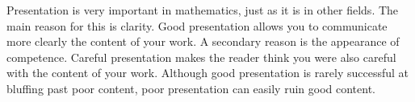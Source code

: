 
%
%
%
%
%
%
%



Presentation is very important in mathematics, just as it is in other
fields. The main reason for this is clarity. Good presentation allows you
to  communicate more clearly the content of your work.
A secondary reason is the appearance of competence. Careful presentation
makes the reader think you were also careful with the content of your
work. Although good presentation is rarely successful at bluffing past poor
content, poor presentation can easily ruin good content.

